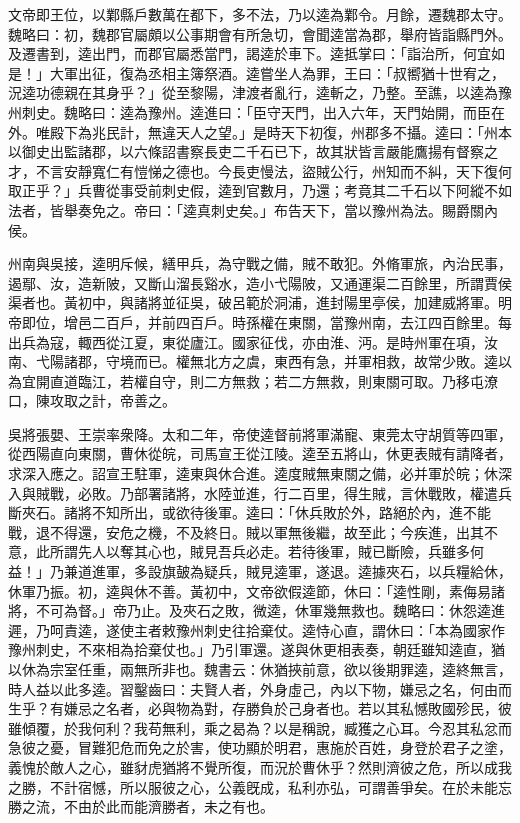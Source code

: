 \begin{pinyinscope}
文帝即王位，以鄴縣戶數萬在都下，多不法，乃以逵為鄴令。月餘，遷魏郡太守。魏略曰：初，魏郡官屬頗以公事期會有所急切，會聞逵當為郡，舉府皆詣縣門外。及遷書到，逵出門，而郡官屬悉當門，謁逵於車下。逵抵掌曰：「詣治所，何宜如是！」大軍出征，復為丞相主簿祭酒。逵嘗坐人為罪，王曰：「叔嚮猶十世宥之，況逵功德親在其身乎？」從至黎陽，津渡者亂行，逵斬之，乃整。至譙，以逵為豫州刺史。魏略曰：逵為豫州。逵進曰：「臣守天門，出入六年，天門始開，而臣在外。唯殿下為兆民計，無違天人之望。」是時天下初復，州郡多不攝。逵曰：「州本以御史出監諸郡，以六條詔書察長吏二千石已下，故其狀皆言嚴能鷹揚有督察之才，不言安靜寬仁有愷悌之德也。今長吏慢法，盜賊公行，州知而不糾，天下復何取正乎？」兵曹從事受前刺史假，逵到官數月，乃還；考竟其二千石以下阿縱不如法者，皆舉奏免之。帝曰：「逵真刺史矣。」布告天下，當以豫州為法。賜爵關內侯。

州南與吳接，逵明斥候，繕甲兵，為守戰之備，賊不敢犯。外脩軍旅，內治民事，遏鄢、汝，造新陂，又斷山溜長谿水，造小弋陽陂，又通運渠二百餘里，所謂賈侯渠者也。黃初中，與諸將並征吳，破呂範於洞浦，進封陽里亭侯，加建威將軍。明帝即位，增邑二百戶，并前四百戶。時孫權在東關，當豫州南，去江四百餘里。每出兵為寇，輙西從江夏，東從廬江。國家征伐，亦由淮、沔。是時州軍在項，汝南、弋陽諸郡，守境而已。權無北方之虞，東西有急，并軍相救，故常少敗。逵以為宜開直道臨江，若權自守，則二方無救；若二方無救，則東關可取。乃移屯潦口，陳攻取之計，帝善之。

吳將張嬰、王崇率衆降。太和二年，帝使逵督前將軍滿寵、東莞太守胡質等四軍，從西陽直向東關，曹休從皖，司馬宣王從江陵。逵至五將山，休更表賊有請降者，求深入應之。詔宣王駐軍，逵東與休合進。逵度賊無東關之備，必并軍於皖；休深入與賊戰，必敗。乃部署諸將，水陸並進，行二百里，得生賊，言休戰敗，權遣兵斷夾石。諸將不知所出，或欲待後軍。逵曰：「休兵敗於外，路絕於內，進不能戰，退不得還，安危之機，不及終日。賊以軍無後繼，故至此；今疾進，出其不意，此所謂先人以奪其心也，賊見吾兵必走。若待後軍，賊已斷險，兵雖多何益！」乃兼道進軍，多設旗皷為疑兵，賊見逵軍，遂退。逵據夾石，以兵糧給休，休軍乃振。初，逵與休不善。黃初中，文帝欲假逵節，休曰：「逵性剛，素侮易諸將，不可為督。」帝乃止。及夾石之敗，微逵，休軍幾無救也。魏略曰：休怨逵進遲，乃呵責逵，遂使主者敕豫州刺史往拾棄仗。逵恃心直，謂休曰：「本為國家作豫州刺史，不來相為拾棄仗也。」乃引軍還。遂與休更相表奏，朝廷雖知逵直，猶以休為宗室任重，兩無所非也。魏書云：休猶挾前意，欲以後期罪逵，逵終無言，時人益以此多逵。習鑿齒曰：夫賢人者，外身虛己，內以下物，嫌忌之名，何由而生乎？有嫌忌之名者，必與物為對，存勝負於己身者也。若以其私憾敗國殄民，彼雖傾覆，於我何利？我苟無利，乘之曷為？以是稱說，臧獲之心耳。今忍其私忿而急彼之憂，冒難犯危而免之於害，使功顯於明君，惠施於百姓，身登於君子之塗，義愧於敵人之心，雖豺虎猶將不覺所復，而況於曹休乎？然則濟彼之危，所以成我之勝，不計宿憾，所以服彼之心，公義旣成，私利亦弘，可謂善爭矣。在於未能忘勝之流，不由於此而能濟勝者，未之有也。


\end{pinyinscope}
